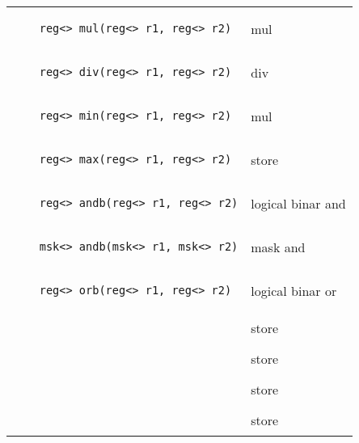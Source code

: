 \begin{longtable}{l R{10cm}}
\begin{lstlisting}
    reg<> mul(reg<> r1, reg<> r2)\end{lstlisting} & mul\\
\begin{lstlisting}
    reg<> div(reg<> r1, reg<> r2)\end{lstlisting} & div\\
\begin{lstlisting}
    reg<> min(reg<> r1, reg<> r2)\end{lstlisting} & mul\\
\begin{lstlisting}
    reg<> max(reg<> r1, reg<> r2)\end{lstlisting} & store\\
\begin{lstlisting}
    reg<> andb(reg<> r1, reg<> r2)\end{lstlisting} & logical binar and\\
\begin{lstlisting}
    msk<> andb(msk<> r1, msk<> r2)\end{lstlisting} & mask and\\
\begin{lstlisting}
    reg<> orb(reg<> r1, reg<> r2)\end{lstlisting} & logical binar or\\
\begin{lstlisting}
    \end{lstlisting} & store\\
\begin{lstlisting}
    \end{lstlisting} & store\\
\begin{lstlisting}
    \end{lstlisting} & store\\
\begin{lstlisting}
    \end{lstlisting} & store\\

\end{longtable}
